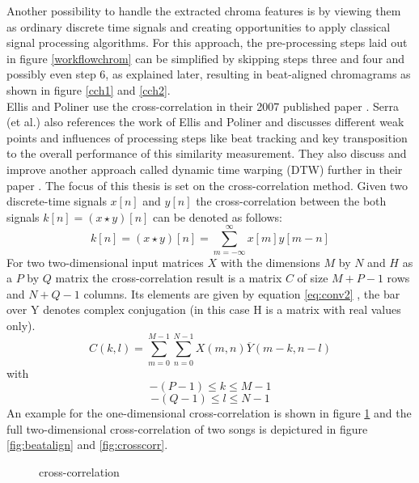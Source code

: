 Another possibility to handle the extracted chroma features is by viewing them as ordinary discrete time signals and creating opportunities to apply classical signal processing algorithms. For this approach, the pre-processing steps laid out in figure \ref{workflowchrom} can be simplified by skipping steps three and four and possibly even step 6, as explained later, resulting in beat-aligned chromagrams as shown in figure \ref{cch1} and \ref{cch2}.\\
Ellis and Poliner use the cross-correlation in their 2007 published paper \cite{chroma3}. Serra (et al.) also references the work of Ellis and Poliner and discusses different weak points and influences of processing steps like beat tracking and key transposition to the overall performance of this similarity measurement. 
They also discuss and improve another approach called dynamic time warping (DTW) further in their paper \cite{chroma2}. The focus of this thesis is set on the cross-correlation method. 
Given two discrete-time signals $x[n]$ and $y[n]$ the cross-correlation between the both signals $k[n] = (x \star y)[n]$ can be denoted as follows:
\begin{equation} \label{eq:conv1}
k[n] = (x \star y)[n] = \sum_{m = -\infty}^{\infty}{x[m] y[m - n]} 
\end{equation}
For two two-dimensional input matrices $X$ with the dimensions $M$ by $N$ and $H$ as a $P$ by $Q$ matrix the cross-correlation result is a matrix $C$ of size $M + P - 1$ rows and $N + Q - 1$ columns. Its elements are given by equation \ref{eq:conv2} \cite{mathcorr}, the bar over Y denotes complex conjugation (in this case H is a matrix with real values only). 
\begin{equation} \label{eq:conv2}
C(k, l) = \sum_{m = 0}^{M - 1}{\sum_{n = 0}^{N - 1}{X(m, n)\overline{Y}(m - k, n - l)}}
\end{equation}
with 
\begin{equation} \label{eq:conv3}
-(P - 1) \leq k \leq M - 1
\end{equation}
\begin{equation} \label{eq:conv4}
-(Q - 1) \leq l \leq N - 1
\end{equation}
An example for the one-dimensional cross-correlation is shown in figure \ref{fig:corr1} and the full two-dimensional cross-correlation of two songs is depictured in figure \ref{fig:beatalign} and \ref{fig:crosscorr}.
\begin{figure}[htbp]
	\centering
	\caption{cross-correlation}
	\label{fig:corr1}
\end{figure}
